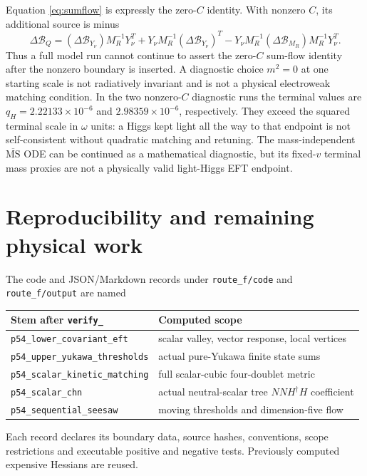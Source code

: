 \documentclass[11pt]{article}
\newcommand{\MS}{\overline{\mathrm{MS}}}
\newcommand{\B}{\mathcal B}
\begin{document}
Equation \eqref{eq:sumflow} is expressly the zero-$C$ identity. With
nonzero $C$, its additional source is minus
\begin{equation}
 \Delta\B_Q=(\Delta\B_{Y_\nu})M_R^{-1}Y_\nu^T
 +Y_\nu M_R^{-1}(\Delta\B_{Y_\nu})^T
 -Y_\nu M_R^{-1}(\Delta\B_{M_R})M_R^{-1}Y_\nu^T.
\end{equation}
Thus a full model run cannot continue to assert the zero-$C$ sum-flow
identity after the nonzero boundary is inserted. A diagnostic choice
$m^2=0$ at one starting scale is not radiatively invariant and is not
a physical electroweak matching condition.
In the two nonzero-$C$ diagnostic runs the terminal values are
$q_H=2.22133\times10^{-6}$ and $2.98359\times10^{-6}$, respectively.
They exceed the squared terminal scale in $\omega$ units: a Higgs
kept light all the way to that endpoint is not self-consistent without
quadratic matching and retuning. The mass-independent $\MS$ ODE can
be continued as a mathematical diagnostic, but its fixed-$v$ terminal
mass proxies are not a physically valid light-Higgs EFT endpoint.

\section{Reproducibility and remaining physical work}
The code and JSON/Markdown records under \texttt{route\_f/code} and
\texttt{route\_f/output} are named
\begin{center}\small
\begin{tabular}{ll}
\toprule
Stem after \texttt{verify\_} & Computed scope\\
\midrule
\texttt{p54\_lower\_covariant\_eft} & scalar valley, vector response, local vertices\\
\texttt{p54\_upper\_yukawa\_thresholds} & actual pure-Yukawa finite state sums\\
\texttt{p54\_scalar\_kinetic\_matching} & full scalar-cubic four-doublet metric\\
\texttt{p54\_scalar\_chn} & actual neutral-scalar tree $NNH^\dagger H$ coefficient\\
\texttt{p54\_sequential\_seesaw} & moving thresholds and dimension-five flow\\
\bottomrule
\end{tabular}
\end{center}
Each record declares its boundary data, source hashes, conventions,
scope restrictions and executable positive and negative tests.
Previously computed expensive Hessians are reused.
\end{document}

